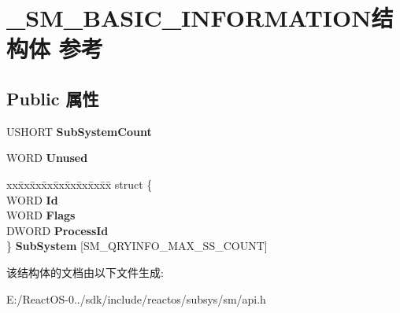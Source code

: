 \hypertarget{struct___s_m___b_a_s_i_c___i_n_f_o_r_m_a_t_i_o_n}{}\section{\+\_\+\+S\+M\+\_\+\+B\+A\+S\+I\+C\+\_\+\+I\+N\+F\+O\+R\+M\+A\+T\+I\+O\+N结构体 参考}
\label{struct___s_m___b_a_s_i_c___i_n_f_o_r_m_a_t_i_o_n}
\subsection*{Public 属性}
\begin{DoxyCompactItemize}
\item 
\mbox{\label{struct___s_m___b_a_s_i_c___i_n_f_o_r_m_a_t_i_o_n_ab6ee350cd76b8a13bcdc20b9da8528b5}} 
U\+S\+H\+O\+RT {\bfseries Sub\+System\+Count}
\item 
\mbox{\label{struct___s_m___b_a_s_i_c___i_n_f_o_r_m_a_t_i_o_n_ad792d8539fc2e431eb45dc30de13ec0e}} 
W\+O\+RD {\bfseries Unused}
\item 
\mbox{\label{struct___s_m___b_a_s_i_c___i_n_f_o_r_m_a_t_i_o_n_ac590314b5d42fcdd50d77e901fc68de1}} 
\begin{tabbing}
xx\=xx\=xx\=xx\=xx\=xx\=xx\=xx\=xx\=\kill
struct \{\\
\>WORD {\bfseries Id}\\
\>WORD {\bfseries Flags}\\
\>DWORD {\bfseries ProcessId}\\
\} {\bfseries SubSystem} \mbox{[}SM\_QRYINFO\_MAX\_SS\_COUNT\mbox{]}\\

\end{tabbing}\end{DoxyCompactItemize}


该结构体的文档由以下文件生成\+:\begin{DoxyCompactItemize}
\item 
E\+:/\+React\+O\+S-\/0../sdk/include/reactos/subsys/sm/api.\+h\end{DoxyCompactItemize}
